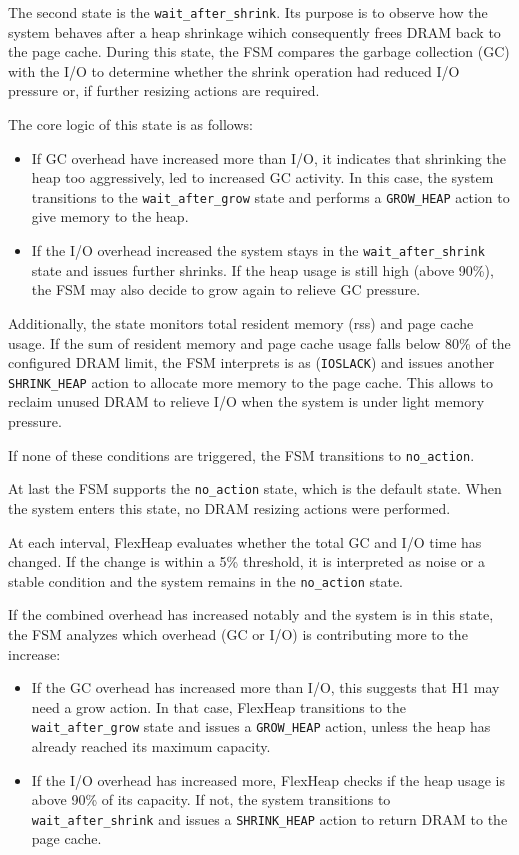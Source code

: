The second state is the \texttt{wait\_after\_shrink}. Its purpose is to observe
how the system behaves after a heap shrinkage wihich consequently frees DRAM
back to the page cache. During this state, the FSM compares the garbage
collection (GC) with the I/O to determine whether the shrink operation had
reduced I/O pressure or, if further resizing actions are required.

The core logic of this state is as follows:
\begin{itemize}

	\item
	      If GC overhead have increased more than I/O, it indicates that shrinking the heap too aggressively,
	      led to increased GC activity. In this case, the system transitions to the \texttt{wait\_after\_grow} state
	      and performs a \texttt{GROW\_HEAP} action to give memory to the heap.

	\item If the I/O overhead increased the system stays in the \texttt{wait\_after\_shrink} state and issues further shrinks.
	      If the heap usage is still high (above 90\%), the FSM may also decide to grow again to relieve GC pressure.
\end{itemize}

Additionally, the state monitors total resident memory (rss) and page cache
usage. If the sum of resident memory and page cache usage falls below 80\% of
the configured DRAM limit, the FSM interprets is as (\texttt{IOSLACK}) and
issues another \texttt{SHRINK\_HEAP} action to allocate more memory to the page
cache. This allows to reclaim unused DRAM to relieve I/O when the system is
under light memory pressure.

If none of these conditions are triggered, the FSM
transitions to \texttt{no\_action}.

At last the FSM supports the \texttt{no\_action} state, which is the default state.
When the system enters this state, no DRAM resizing actions were performed.

At each interval, FlexHeap evaluates whether the total GC and I/O time has
changed. If the change is within a 5\% threshold, it is interpreted
as noise or a stable condition and the system remains in the \texttt{no\_action} state.

If the combined overhead has increased notably and the system is in this state, the FSM analyzes which overhead (GC or I/O) is
contributing more to the increase:
\begin{itemize}
	\item If the GC overhead has increased more than I/O, this suggests that H1 may need a grow action.
	      In that case, FlexHeap transitions to the \texttt{wait\_after\_grow} state and issues a \texttt{GROW\_HEAP} action,
	      unless the heap has already reached its maximum capacity.

	\item If the I/O overhead has increased more, FlexHeap checks if the heap usage is above 90\% of
	      its capacity. If not, the system transitions to \texttt{wait\_after\_shrink} and issues a \texttt{SHRINK\_HEAP}
	      action to return DRAM to the page cache.
\end{itemize}

